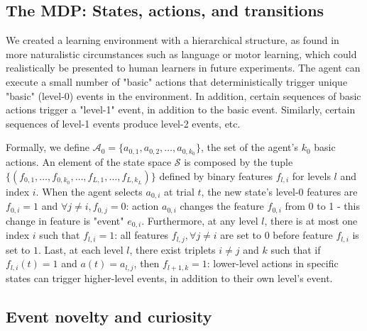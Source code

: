 \documentclass{article}
\begin{document}
\subsection{The MDP: States, actions, and transitions}

We created a learning environment with a hierarchical structure, as found in more naturalistic circumstances such as language or motor learning, which could realistically be presented to human learners in future experiments. %
The agent can execute a small number of "basic" actions that deterministically trigger unique "basic" (level-0) events in the environment. In addition, certain sequences of basic actions trigger a "level-1" event, in addition to the basic event. Similarly, certain sequences of level-1 events produce level-2 events, etc.

Formally, we define $\mathcal{A}_0 = \{a_{0, 1}, a_{0, 2}, \ldots, a_{0, k_0}\}$, the set of the agent's $k_0$ basic actions. An element of the state space $\mathcal{S}$ is composed by the tuple $\{(f_{0, 1}, \ldots, f_{0, k_0}, \ldots, f_{L, 1}, \ldots, f_{L, k_L})\}$ defined by binary features $f_{l, i}$ for levels $l$ and index $i$. When the agent selects $a_{0,i}$ at trial $t$, the new state's level-0 features are $f_{0,i}=1$ and $\forall j \neq i, f_{0,j}=0$: action $a_{0, i}$ changes the feature $f_{0, i}$ from 0 to 1 - this change in feature is "event" $e_{0, i}$. Furthermore, at any level $l$, there is at most one index $i$ such that $f_{l,i}=1$: all features $f_{l, j}, \forall j\neq i$ are set to $0$ before feature $f_{l, i}$ is set to $1$. Last, at each level $l$, there exist triplets $i \neq j$ and $k$ such that if $f_{l,i}(t)=1$ and $a(t)=a_{l,j}$, then $f_{l+1, k}=1$: lower-level actions in specific states can trigger higher-level events, in addition to their own level's event.


\subsection{Event novelty and curiosity}
\end{document}
